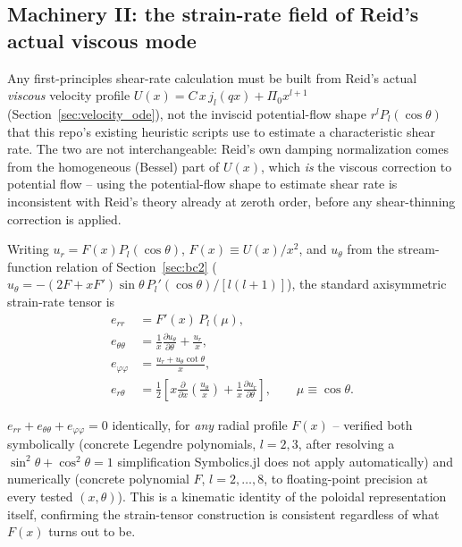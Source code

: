 \subsection{Machinery II: the strain-rate field of Reid's actual viscous mode}
\label{sec:cy_strain}

Any first-principles shear-rate calculation must be built from Reid's actual
\emph{viscous} velocity profile $U(x)=C\,x\,j_l(qx)+\Pi_0x^{l+1}$
(Section~\ref{sec:velocity_ode}), not the inviscid potential-flow shape
$r^lP_l(\cos\theta)$ that this repo's existing heuristic scripts use to
estimate a characteristic shear rate. The two are not interchangeable: Reid's
own damping normalization comes from the homogeneous (Bessel) part of
$U(x)$, which \emph{is} the viscous correction to potential flow -- using
the potential-flow shape to estimate shear rate is inconsistent with Reid's
theory already at zeroth order, before any shear-thinning correction is
applied.

Writing $u_r=F(x)P_l(\cos\theta)$, $F(x)\equiv U(x)/x^2$, and $u_\theta$
from the stream-function relation of Section~\ref{sec:bc2}
($u_\theta=-(2F+xF')\sin\theta\,P_l'(\cos\theta)/[l(l+1)]$), the standard
axisymmetric strain-rate tensor is
\begin{align}
  e_{rr}   &= F'(x)\,P_l(\mu), \\
  e_{\theta\theta} &= \frac{1}{x}\frac{\partial u_\theta}{\partial\theta} + \frac{u_r}{x}, \\
  e_{\varphi\varphi} &= \frac{u_r + u_\theta\cot\theta}{x}, \\
  e_{r\theta} &= \frac12\left[x\frac{\partial}{\partial x}\!\left(\frac{u_\theta}{x}\right) + \frac{1}{x}\frac{\partial u_r}{\partial\theta}\right],
  \qquad \mu\equiv\cos\theta.
  \label{eq:strain_tensor}
\end{align}

\begin{notebox}
$e_{rr}+e_{\theta\theta}+e_{\varphi\varphi}=0$ identically, for \emph{any}
radial profile $F(x)$ -- verified both symbolically (concrete Legendre
polynomials, $l=2,3$, after resolving a $\sin^2\theta+\cos^2\theta=1$
simplification Symbolics.jl does not apply automatically) and numerically
(concrete polynomial $F$, $l=2,\dots,8$, to floating-point precision at
every tested $(x,\theta)$). This is a kinematic identity of the poloidal
representation itself, confirming the strain-tensor construction is
consistent regardless of what $F(x)$ turns out to be.
\end{notebox}

